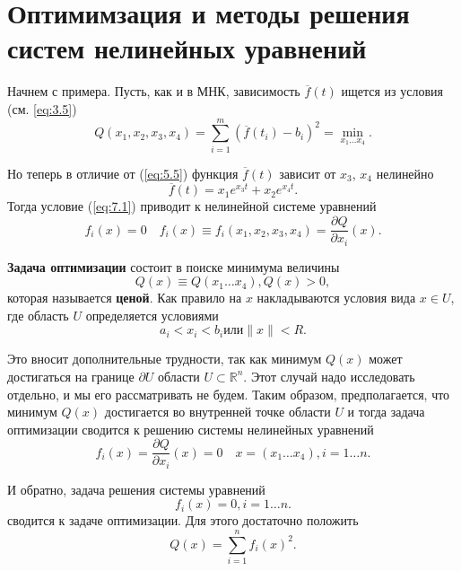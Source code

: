 \section{Оптимимзация и методы решения систем нелинейных уравнений}
\label{lecture7}

Начнем с примера. Пусть, как и в МНК, зависимость $\overline{f}(t)$ ищется из условия (см. \ref{eq:3.5})
\begin{equation} \label{eq:7.1}
	Q(x_1, x_2, x_3, x_4) = \sum^m_{i=1}{(\overline{f}(t_i)-b_i)^2} = \min_{x_1 \dots x_4}.
\end{equation}

Но теперь в отличие от (\ref{eq:5.5}) функция $\overline{f}(t)$ зависит от $x_3$, $x_4$ нелинейно
\begin{equation} \label{eq:7.2}
	\overline{f}(t) = x_1e^{x_3 t} + x_2e^{x_4 t}.
\end{equation}
Тогда условие (\ref{eq:7.1}) приводит к нелинейной системе уравнений
\begin{equation} \label{eq:7.3}
	f_i(x) = 0 \quad
	f_i(x) \equiv f_i(x_1, x_2, x_3, x_4) = \frac{\partial Q}{\partial x_i}(x).
\end{equation}

\textbf{Задача оптимизации} состоит в поиске минимума величины 
\begin{equation} \label{eq:7.4}
	Q(x) \equiv Q(x_1 \dots x_4), Q(x) > 0,
\end{equation}
которая называется \textbf{ценой}. Как правило на $x$ накладываются условия вида $x \in U$, где область $U$ определяется условиями
\begin{equation} \label{eq:7.5}
	a_i < x_i < b_i \textrm{или} \|x\| < R.
\end{equation}

Это вносит дополнительные трудности, так как минимум $Q(x)$ может достигаться на границе $\partial U$  области $U \subset \mathbb{R}^n$. Этот случай надо исследовать отдельно, и мы его рассматривать не будем. Таким образом, предполагается, что минимум $Q(x)$ достигается во внутренней точке области $U$ и тогда задача оптимизации сводится к решению системы нелинейных уравнений
\begin{equation} \label{eq:7.6}
	f_i(x) = \frac{\partial Q}{\partial x_i}(x) = 0 \quad x = (x_1 \dots x_4), i = 1 \dots n.
\end{equation}

И обратно, задача решения системы уравнений
\begin{equation} \label{eq:7.7}
	f_i(x) = 0, i = 1 \dots n.
\end{equation}
сводится к задаче оптимизации. Для этого достаточно положить
\begin{equation} \label{eq:7.8}
	Q(x) = \sum^n_{i=1}{f_i(x)^2}.
\end{equation}

